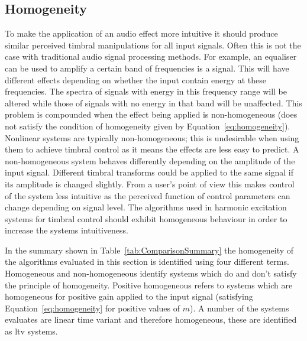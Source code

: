 	\subsection{Homogeneity}
	\label{sec:ExcitationEvaluation-Evaluation-Homogeneity}
		To make the application of an audio effect more intuitive it should produce similar perceived timbral
		manipulations for all input signals. Often this is not the case with traditional audio signal processing
		methods. For example, an equaliser can be used to amplify a certain band of frequencies is a signal. This
		will have different effects depending on whether the input contain energy at these frequencies. The spectra
		of signals with energy in this frequency range will be altered while those of signals with no energy in
		that band will be unaffected. This problem is compounded when the effect being applied is non-homogeneous
		(does not satisfy the condition of homogeneity given by Equation~\ref{eq:homogeneity}). Nonlinear systems
		are typically non-homogeneous; this is undesirable when using them to achieve timbral control as it means
		the effects are less easy to predict. A non-homogeneous system behaves differently depending on the
		amplitude of the input signal. Different timbral transforms could be applied to the same signal if its
		amplitude is changed slightly. From a user's point of view this makes control of the system less intuitive
		as the perceived function of control parameters can change depending on signal level. The algorithms used
		in harmonic excitation systems for timbral control should exhibit homogeneous behaviour in order to
		increase the systems intuitiveness.

		In the summary shown in Table~\ref{tab:ComparisonSummary} the homogeneity of the algorithms evaluated in
		this section is identified using four different terms. Homogeneous and non-homogeneous identify systems
		which do and don't satisfy the principle of homogeneity. Positive homogeneous refers to systems which are
		homogeneous for positive gain applied to the input signal (satisfying Equation~\ref{eq:homogeneity} for
		positive values of $m$). A number of the systems evaluates are linear time variant and therefore
		homogeneous, these are identified as \acrshort{ltv} systems.

